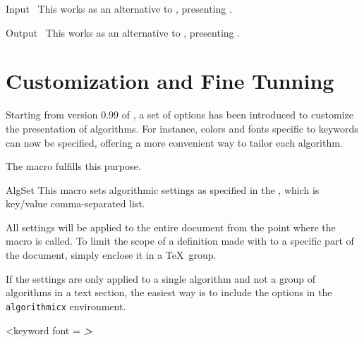 \documentclass[a4paper, 11pt]{article}
\begin{document}
\begin{Macrodef}{Input}{~}{}
    This works as an alternative to , presenting .
\end{Macrodef}
\begin{Macrodef}{Output}{~}{}
    This works as an alternative to , presenting .
\end{Macrodef}


\section{Customization and Fine Tunning}\label{sec:customization-and-fine-tunning}
Starting from version 0.99 of , a set of options has been introduced to customize the presentation of algorithms. For instance, colors and fonts specific to keywords can now be specified, offering a more convenient way to tailor each algorithm.

The  macro fulfills this purpose.

\begin{Macrodef}{AlgSet}{}{}
    This macro sets algorithmic settings as specified in the , which is key/value comma-separated list.

    All settings will be applied to the entire document from the point where the macro is called. To limit the scope of a definition made with  to a specific part of the document, simply enclose it in a \TeX\ group.
\end{Macrodef}

\begingroup
\begin{PDExample}
    \begin{algorithmic}
        \EndIf
    \end{algorithmic}
\end{PDExample}
\endgroup%

If the settings are only applied to a single algorithm and not a group of algorithms in a text section, the easiest way is to include the options in the \texttt{algorithmicx} environment.

\begin{PDExample}
    \begin{algorithmic}
        <keyword font = \sffamily\bfseries\itshape>
        \EndIf
    \end{algorithmic}
\end{PDExample}
\end{document}
